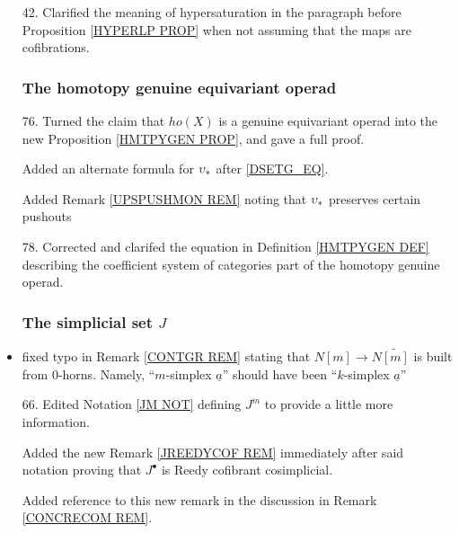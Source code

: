 \documentclass{article}
\begin{document}
\begin{itemize}
\item[42.] Clarified the meaning of hypersaturation in the paragraph before Proposition \ref{HYPERLP PROP} when not assuming that the maps are cofibrations. %

      

          
      \subsubsection*{The homotopy genuine equivariant operad}
\item[76.] Turned the claim that $ho(X)$ is a genuine equivariant operad into the new Proposition \ref{HMTPYGEN PROP}, and gave a full proof.
      
      
      Added an alternate formula for $\upsilon_{\**}$ after \eqref{DSETG_EQ}.
      
      Added Remark \ref{UPSPUSHMON REM} noting that $\upsilon_{\**}$ preserves certain pushouts %
      
      
\item[78.] Corrected and clarifed the equation in Definition \ref{HMTPYGEN DEF} describing the coefficient system of categories part of the homotopy genuine operad. %



      
      \subsubsection*{The simplicial set $J$}
\item fixed typo in Remark \ref{CONTGR REM} stating that $N[m] \to N \widetilde{[m]}$ is built from $0$-horns. Namely, ``$m$-simplex $\underline{a}$'' should have been ``$k$-simplex $\underline{a}$'' %

\item[66.] Edited Notation \ref{JM NOT} defining $J^m$ to provide a little more information.

Added the new Remark \ref{JREEDYCOF REM} immediately after said notation proving that $J^{\bullet}$ is Reedy cofibrant cosimplicial.

Added reference to this new remark in the discussion in Remark \ref{CONCRECOM REM}.


\end{itemize}
\end{document}
